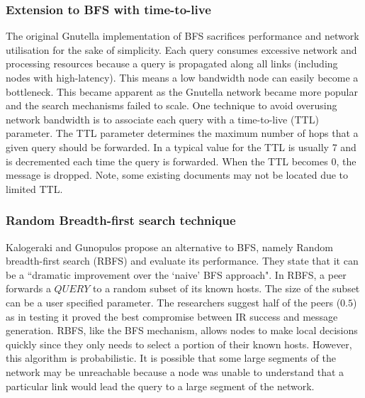 
\subsubsection{Extension to BFS with time-to-live}

The original Gnutella implementation of BFS sacrifices performance and network utilisation for the sake of simplicity. Each query consumes excessive network and processing resources because a query is propagated along all links (including nodes with high-latency)\cite{zeinalipour2004information}. This means a low bandwidth node can easily become a bottleneck. This became apparent as the Gnutella network became more popular and the search mechanisms failed to scale. One technique to avoid overusing network bandwidth is to associate each query with a time-to-live (TTL) parameter. The TTL parameter determines the maximum number of hops that a given query should be forwarded. In a typical value for the TTL is usually 7 and is decremented each time the query is forwarded. When the TTL becomes 0, the message is dropped. Note, some existing documents may not be located due to limited TTL\@.

\subsubsection{Random Breadth-first search technique}

Kalogeraki and Gunopulos propose an alternative to BFS, namely Random breadth-first search (RBFS) and evaluate its performance\cite{kalogeraki2002local}. They state that it can be a ``dramatic improvement over the `naive' BFS approach". In RBFS, a peer forwards a $QUERY$ to a random subset of its known hosts. The size of the subset can be a user specified parameter. The researchers suggest half of the peers ($0.5$) as in testing it proved the best compromise between IR success and message generation. RBFS, like the BFS mechanism, allows nodes to make local decisions quickly since they only needs to select a portion of their known hosts. However, this algorithm is probabilistic. It is possible that some large segments of the network may be unreachable because a node was unable to understand that a particular link would lead the query to a large segment of the network.\cite{zeinalipour2004information}


